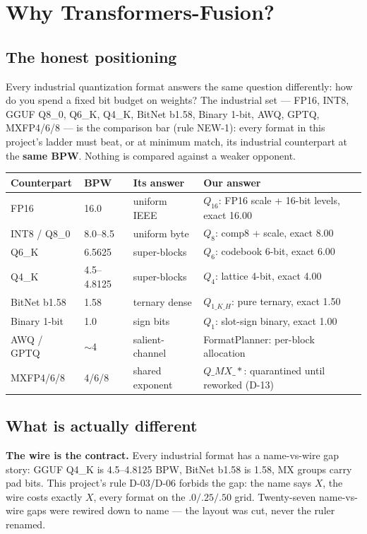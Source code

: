 \chapter{Why Transformers-Fusion?}

\section{The honest positioning}

Every industrial quantization format answers the same question differently: how do you spend a
fixed bit budget on weights? The industrial set --- FP16, INT8, GGUF Q8\_0, Q6\_K, Q4\_K,
BitNet b1.58, Binary 1-bit, AWQ, GPTQ, MXFP4/6/8 --- is the comparison bar (rule NEW-1): every
format in this project's ladder must beat, or at minimum match, its industrial counterpart at
the \textbf{same BPW}. Nothing is compared against a weaker opponent.

\begin{tabular}{@{}llll@{}}
\toprule
Counterpart & BPW & Its answer & Our answer\\
\midrule
FP16 & 16.0 & uniform IEEE & $Q_{16}$: FP16 scale + 16-bit levels, exact 16.00\\
INT8 / Q8\_0 & 8.0--8.5 & uniform byte & $Q_8$: comp8 + scale, exact 8.00\\
Q6\_K & 6.5625 & super-blocks & $Q_6$: codebook 6-bit, exact 6.00\\
Q4\_K & 4.5--4.8125 & super-blocks & $Q_4$: lattice 4-bit, exact 4.00\\
BitNet b1.58 & 1.58 & ternary dense & $Q_{1\_K\_H}$: pure ternary, exact 1.50\\
Binary 1-bit & 1.0 & sign bits & $Q_1$: slot-sign binary, exact 1.00\\
AWQ / GPTQ & $\sim$4 & salient-channel & FormatPlanner: per-block allocation\\
MXFP4/6/8 & 4/6/8 & shared exponent & $Q\_MX\_\ast$: quarantined until reworked (D-13)\\
\bottomrule
\end{tabular}

\section{What is actually different}

\textbf{The wire is the contract.} Every industrial format has a name-vs-wire gap story: GGUF
Q4\_K is 4.5--4.8125 BPW, BitNet b1.58 is 1.58, MX groups carry pad bits. This project's rule
D-03/D-06 forbids the gap: the name says $X$, the wire costs exactly $X$, every format on the
$.0/.25/.50$ grid. Twenty-seven name-vs-wire gaps were rewired down to name --- the layout was
cut, never the ruler renamed.

